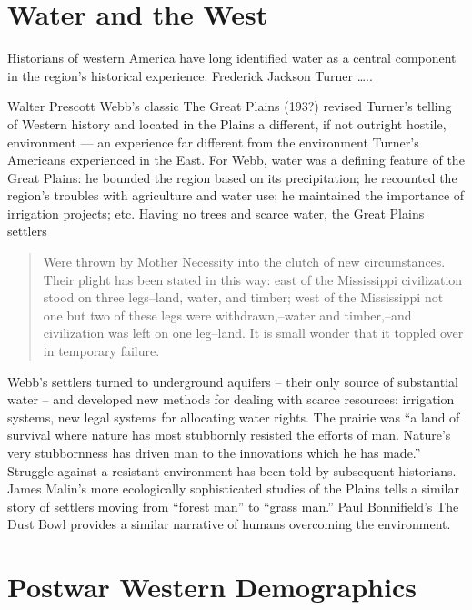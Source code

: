 \documentclass[11pt,article,oneside]{memoir}
\begin{document}
\section{Water and the West}

Historians of western America have long identified water as a central
component in the region's historical experience. Frederick Jackson
Turner \ldots{}..

Walter Prescott Webb's classic The Great Plains (193?) revised Turner's
telling of Western history and located in the Plains a different, if not
outright hostile, environment --- an experience far different from the
environment Turner's Americans experienced in the East. For Webb, water
was a defining feature of the Great Plains: he bounded the region based
on its precipitation; he recounted the region's troubles with
agriculture and water use; he maintained the importance of irrigation
projects; etc. Having no trees and scarce water, the Great Plains
settlers

\begin{quote}
Were thrown by Mother Necessity into the clutch of new circumstances.
Their plight has been stated in this way: east of the Mississippi
civilization stood on three legs--land, water, and timber; west of the
Mississippi not one but two of these legs were withdrawn,--water and
timber,--and civilization was left on one leg--land. It is small wonder
that it toppled over in temporary failure.
\end{quote}

Webb's settlers turned to underground aquifers -- their only source of
substantial water -- and developed new methods for dealing with scarce
resources: irrigation systems, new legal systems for allocating water
rights. The prairie was ``a land of survival where nature has most
stubbornly resisted the efforts of man. Nature's very stubbornness has
driven man to the innovations which he has made.'' Struggle against a
resistant environment has been told by subsequent historians. James
Malin's more ecologically sophisticated studies of the Plains tells a
similar story of settlers moving from ``forest man'' to ``grass man.''
Paul Bonnifield's The Dust Bowl provides a similar narrative of humans
overcoming the environment.

\section{Postwar Western Demographics}
\end{document}
